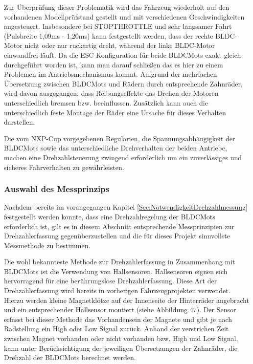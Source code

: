 Zur Überprüfung dieser Problematik wird das Fahrzeug wiederholt auf den vorhandenen Modellprüfstand gestellt und mit verschiedenen Geschwindigkeiten angesteuert. Insbesondere bei \glqq{}STOPTHROTTLE\grqq{} und sehr langsamer Fahrt (Pulsbreite 1,09ms - 1,20ms) kann festgestellt werden, dass der rechte BLDC-Motor nicht oder nur ruckartig dreht, während der linke BLDC-Motor einwandfrei läuft. Da die ESC-Konfiguration für beide \acp{BLDCMot} exakt gleich durchgeführt worden ist, kann man darauf schließen das es hier zu einem  Problemen im Antriebsmechanismus kommt. Aufgrund der mehrfachen Übersetzung zwischen \acp{BLDCMot} und Rädern durch entsprechende Zahnräder, wird davon ausgegangen, dass Reibungseffekte das Drehen der Motoren unterschiedlich bremsen bzw. beeinflussen. Zusätzlich kann auch die unterschiedlich feste Montage der Räder eine Ursache für dieses Verhalten darstellen.

Die vom NXP-Cup vorgegebenen Regularien, die Spannungsabhängigkeit der \acp{BLDCMot} sowie das unterschiedliche Drehverhalten der beiden Antriebe, machen eine Drehzahlsteuerung zwingend erforderlich um ein zuverlässiges und sicheres Fahrverhalten zu gewährleisten.\vspace{11pt}


\subsubsection{Auswahl des Messprinzips}\label{Sec4Sub5Sub2}

Nachdem bereits im vorangegangen Kapitel \ref{Sec:NotwendigkeitDrehzahlmessung} festgestellt werden konnte, dass eine Drehzahlregelung der \acp{BLDCMot} erforderlich ist, gilt es in diesem Abschnitt entsprechende Messprinzipien zur Drehzahlerfassung gegenüberzustellen und die für dieses Projekt sinnvollste Messmethode zu bestimmen.\vspace{11pt}

Die wohl bekannteste Methode zur Drehzahlerfassung in Zusammenhang mit \acp{BLDCMot} ist die Verwendung von Hallsensoren. Hallsensoren eignen sich hervorragend für eine berührungslose Drehzahlerfassung. Diese Art der Drehzahlerfassung wird bereits in vorherigen Fahrzeugprojekten verwendet. Hierzu werden kleine Magnetklötze auf der Innenseite der Hinterräder angebracht und ein entsprechender Hallsensor montiert (siehe Abbildung 47). Der Sensor erfasst bei dieser Methode das Vorhandensein der Magnete und gibt je nach Radstellung ein High oder Low Signal zurück. Anhand der verstrichen Zeit zwischen Magnet vorhanden oder nicht vorhanden bzw. High und Low Signal, kann unter Berücksichtigung der jeweiligen Übersetzungen der Zahnräder, die Drehzahl der \acp{BLDCMot} berechnet werden.


